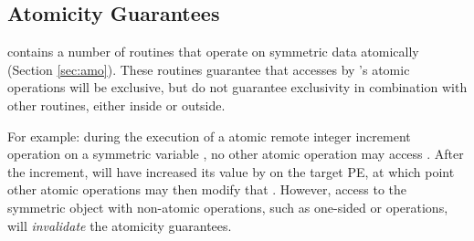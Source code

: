 \subsection{Atomicity Guarantees}
\label{sec:amo_guarantees}
\openshmem contains a number of routines that operate on symmetric data
atomically (Section \ref{sec:amo}).  These routines guarantee that accesses by \openshmem's
atomic operations will be exclusive, but do not guarantee exclusivity
in combination with other routines, either inside \openshmem or
outside.

For example: during the execution of a atomic remote integer increment
operation on a symmetric variable , no other \openshmem atomic
operation may access .  After the increment,  will have
increased its value by  on the target \ac{PE}, at which point other
atomic operations may then modify that .
However, access to the symmetric
object  with non-atomic operations, such as one-sided  or  operations,
 will \textit{invalidate} the atomicity guarantees.

